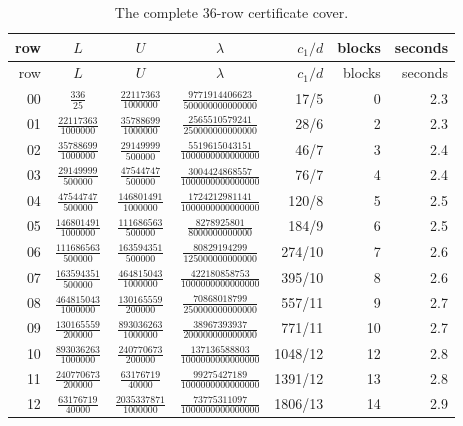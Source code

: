 \documentclass[11pt]{amsart}
\theoremstyle{definition}
\theoremstyle{remark}
\numberwithin{equation}{section}
\begin{document}
\begingroup
\footnotesize
\setlength{\tabcolsep}{1.5pt}
\renewcommand{\arraystretch}{1.12}
\begin{longtable}{@{}rccc rrr@{}}
\caption{The complete 36-row certificate cover.}\label{tab:row-inventory}\\
\toprule
row & $L$ & $U$ & $\lambda$ & $c_1/d$ & blocks & seconds \\
\midrule
\endfirsthead
\toprule
row & $L$ & $U$ & $\lambda$ & $c_1/d$ & blocks & seconds \\
\midrule
\endhead
00 & $\tfrac{336}{25}$ & $\tfrac{22117363}{1000000}$ & $\tfrac{9771914406623}{500000000000000}$ & 17/5 & 0 & 2.3 \\
01 & $\tfrac{22117363}{1000000}$ & $\tfrac{35788699}{1000000}$ & $\tfrac{2565510579241}{250000000000000}$ & 28/6 & 2 & 2.3 \\
02 & $\tfrac{35788699}{1000000}$ & $\tfrac{29149999}{500000}$ & $\tfrac{5519615043151}{1000000000000000}$ & 46/7 & 3 & 2.4 \\
03 & $\tfrac{29149999}{500000}$ & $\tfrac{47544747}{500000}$ & $\tfrac{3004424868557}{1000000000000000}$ & 76/7 & 4 & 2.4 \\
04 & $\tfrac{47544747}{500000}$ & $\tfrac{146801491}{1000000}$ & $\tfrac{1724212981141}{1000000000000000}$ & 120/8 & 5 & 2.5 \\
05 & $\tfrac{146801491}{1000000}$ & $\tfrac{111686563}{500000}$ & $\tfrac{8278925801}{8000000000000}$ & 184/9 & 6 & 2.5 \\
06 & $\tfrac{111686563}{500000}$ & $\tfrac{163594351}{500000}$ & $\tfrac{80829194299}{125000000000000}$ & 274/10 & 7 & 2.6 \\
07 & $\tfrac{163594351}{500000}$ & $\tfrac{464815043}{1000000}$ & $\tfrac{422180858753}{1000000000000000}$ & 395/10 & 8 & 2.6 \\
08 & $\tfrac{464815043}{1000000}$ & $\tfrac{130165559}{200000}$ & $\tfrac{70868018799}{250000000000000}$ & 557/11 & 9 & 2.7 \\
09 & $\tfrac{130165559}{200000}$ & $\tfrac{893036263}{1000000}$ & $\tfrac{38967393937}{200000000000000}$ & 771/11 & 10 & 2.7 \\
10 & $\tfrac{893036263}{1000000}$ & $\tfrac{240770673}{200000}$ & $\tfrac{137136588803}{1000000000000000}$ & 1048/12 & 12 & 2.8 \\
11 & $\tfrac{240770673}{200000}$ & $\tfrac{63176719}{40000}$ & $\tfrac{99275427189}{1000000000000000}$ & 1391/12 & 13 & 2.8 \\
12 & $\tfrac{63176719}{40000}$ & $\tfrac{2035337871}{1000000}$ & $\tfrac{73775311097}{1000000000000000}$ & 1806/13 & 14 & 2.9 \\

\end{longtable}
\end{document}
